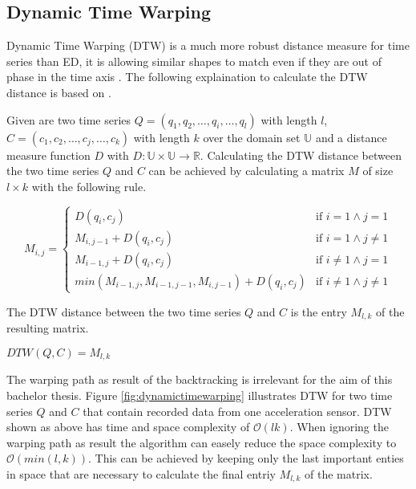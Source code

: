 \subsection{Dynamic Time Warping} \label{dynamic_time_warping}
Dynamic Time Warping (DTW) is a much more robust distance measure for time series than ED, it is allowing
similar shapes to match even if they are out of phase in the time axis \cite{keogh2002exact}. The following explaination
to calculate the DTW distance is based on \cite{sart2010accelerating}.

Given are two time series $Q = (q_1, q_2, \dots, q_i, \dots, q_l)$ with length
$l$, $C = (c_1, c_2, \dots, c_j, \dots, c_k)$ with length $k$ over the domain set $\mathbb{U}$ and a distance measure
function $D$ with $D: \mathbb{U} \times \mathbb{U} \to \mathbb{R}$. Calculating the DTW distance between the two time
series $Q$ and $C$ can be achieved by calculating a matrix $M$ of size $l \times k$ with the following rule.
\begin{center} \[ M_{i, j} = \begin{cases}
    D(q_i,c_j) & \text{if } i = 1 \wedge j = 1\\
    M_{i,j-1} + D(q_i,c_j) & \text{if } i = 1 \wedge j \neq 1\\
    M_{i-1,j} + D(q_i,c_j) & \text{if } i \neq 1 \wedge j = 1\\
    min(M_{i-1,j}, M_{i-1,j-1}, M_{i,j-1}) + D(q_i,c_j) & \text{if } i \neq 1 \wedge j \neq 1
\end{cases} \] \end{center}
The DTW distance between the two time series $Q$ and $C$ is the entry $M_{l,k}$ of the resulting matrix.
\begin{center}
    $DTW(Q, C) = M_{l,k}$
\end{center}
The warping path as result of the backtracking is irrelevant for the aim of this bachelor thesis. Figure
\ref{fig:dynamictimewarping} illustrates DTW for two time series $Q$ and $C$ that contain recorded data from one
acceleration sensor. DTW shown as above has time and space complexity of $\mathcal{O}(lk)$. When ignoring the
warping path as result the algorithm can easely reduce the space complexity to $\mathcal{O}(min(l, k))$. This can be
achieved by keeping only the last important enties in space that are necessary to calculate the final entriy $M_{l,k}$
of the matrix.

